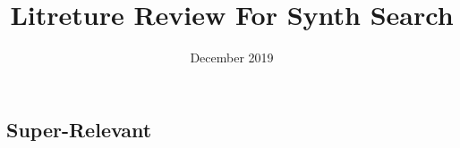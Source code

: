 \documentclass{article}
\title{Litreture Review For Synth Search}
\date{December 2019}
\begin{document}
\maketitle
\subsection{Super-Relevant}



\end{document}
